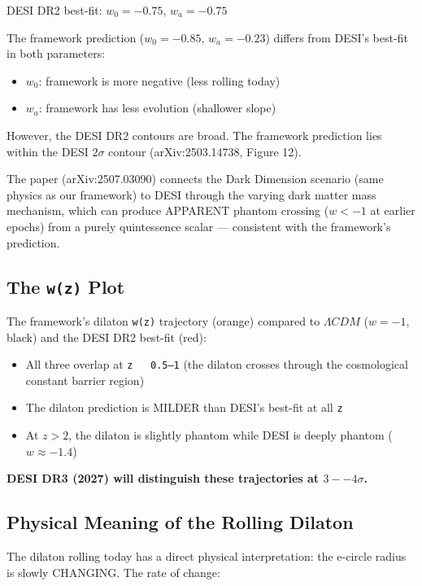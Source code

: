 \documentclass[aps,prd,preprint,superscriptaddress,longbibliography]{revtex4-2}
\begin{document}
DESI DR2 best-fit: $w_{0} = -0.75$, $w_a = -0.75$

The framework prediction ($w_{0} = -0.85$, $w_a = -0.23$) differs from DESI's best-fit in both parameters:


\begin{itemize}
  \item $w_{0}$: framework is more negative (less rolling today)
  \item $w_a$: framework has less evolution (shallower slope)
\end{itemize}

However, the DESI DR2 contours are broad. The framework prediction lies within the DESI $2\sigma$ contour (arXiv:2503.14738, Figure 12).

The \cite{BedroyaVafa2025} paper (arXiv:2507.03090) connects the Dark Dimension scenario (same physics as our framework) to DESI through the varying dark matter mass mechanism, which can produce APPARENT phantom crossing ($w < -1$ at earlier epochs) from a purely quintessence scalar --- consistent with the framework's prediction.



\subsection{The \texttt{w(z)} Plot}

The framework's dilaton \texttt{w(z)} trajectory (orange) compared to $\Lambda CDM$ ($w = -1$, black) and the DESI DR2 best-fit (red):


\begin{itemize}
  \item All three overlap at \texttt{z ~ 0.5--1} (the dilaton crosses through the cosmological constant barrier region)
  \item The dilaton prediction is MILDER than DESI's best-fit at all \texttt{z}
  \item At $z > 2$, the dilaton is slightly phantom while DESI is deeply phantom ($w \approx -1.4$)
\end{itemize}

\textbf{DESI DR3 (2027) will distinguish these trajectories at $3--4\sigma$.}



\subsection{Physical Meaning of the Rolling Dilaton}

The dilaton rolling today has a direct physical interpretation: the e-circle radius is slowly CHANGING. The rate of change:
\end{document}
